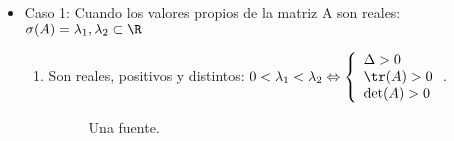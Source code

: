 

\begin{itemize}
\item Caso 1: Cuando los valores propios de la matriz A son reales: $\sigma(A)={\lambda_1,\lambda_2}\subset \R$
\begin{enumerate}
\item Son reales, positivos y distintos: $0<\lambda_1<\lambda_2 \Leftrightarrow \left\{ \begin{array}{ll}\Delta > 0 \\ \tr(A)>0 \\ \det(A) > 0 \end{array}\right.$.

  \begin{figure}[h]
    \centering
    \caption{Una fuente.}

  \end{figure}


\end{enumerate}
\end{itemize}
